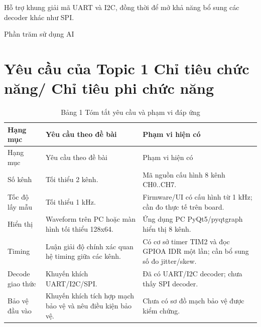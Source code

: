 Hỗ trợ khung giải mã UART và I2C, đồng thời để mở khả năng bổ sung các decoder khác như SPI.

Phần trăm sử dụng AI

\section{Yêu cầu của Topic 1 Chỉ tiêu chức năng/ Chỉ tiêu phi chức năng}\label{yuxeau-cux1ea7u-cux1ee7a-topic-1-chux1ec9-tiuxeau-chux1ee9c-nux103ng-chux1ec9-tiuxeau-phi-chux1ee9c-nux103ng}

\begin{longtable}[]{@{}
  >{\raggedright\arraybackslash}p{}
  >{\raggedright\arraybackslash}p{}
  >{\raggedright\arraybackslash}p{}@{}}
\caption{Bảng 1 Tóm tắt yêu cầu và phạm vi đáp ứng}\tabularnewline
\toprule\noalign{}
\begin{minipage}[b]{\linewidth}\raggedright
Hạng mục
\end{minipage} & \begin{minipage}[b]{\linewidth}\raggedright
Yêu cầu theo đề bài
\end{minipage} & \begin{minipage}[b]{\linewidth}\raggedright
Phạm vi hiện có
\end{minipage} \\
\midrule\noalign{}
\endfirsthead
\toprule\noalign{}
\begin{minipage}[b]{\linewidth}\raggedright
Hạng mục
\end{minipage} & \begin{minipage}[b]{\linewidth}\raggedright
Yêu cầu theo đề bài
\end{minipage} & \begin{minipage}[b]{\linewidth}\raggedright
Phạm vi hiện có
\end{minipage} \\
\midrule\noalign{}
\endhead
\bottomrule\noalign{}
\endlastfoot
Số kênh & Tối thiểu 2 kênh. & Mã nguồn cấu hình 8 kênh CH0..CH7. \\
Tốc độ lấy mẫu & Tối thiểu 1 kHz. & Firmware/UI có cấu hình từ 1 kHz; cần đo thực tế trên board. \\
Hiển thị & Waveform trên PC hoặc màn hình tối thiểu 128x64. & Ứng dụng PC PyQt5/pyqtgraph hiển thị 8 kênh. \\
Timing & Luận giải độ chính xác quan hệ timing giữa các kênh. & Có cơ sở timer TIM2 và đọc GPIOA IDR một lần; cần bổ sung số đo jitter/skew. \\
Decode giao thức & Khuyến khích UART/I2C/SPI. & Đã có UART/I2C decoder; chưa thấy SPI decoder. \\
Bảo vệ đầu vào & Khuyến khích tích hợp mạch bảo vệ và nêu điều kiện bảo vệ. & Chưa có sơ đồ mạch bảo vệ được kiểm chứng. \\
\end{longtable}

